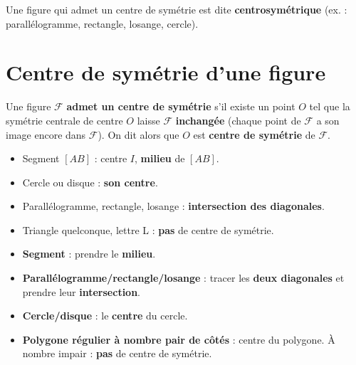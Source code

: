 \begin{remarkbox}
Une figure qui admet un centre de sym\'etrie est dite \textbf{centrosym\'etrique} (ex. : parall\'elogramme, rectangle, losange, cercle).
\end{remarkbox}

\section{Centre de symétrie d'une figure}

\begin{definitionbox}
Une figure $\mathcal F$ \textbf{admet un centre de symétrie} s'il existe un point $O$ tel que la symétrie centrale de centre $O$ laisse $\mathcal F$ \textbf{inchangée} (chaque point de $\mathcal F$ a son image encore dans $\mathcal F$). On dit alors que $O$ est \textbf{centre de symétrie} de $\mathcal F$.
\end{definitionbox}

\begin{examplebox}
\begin{itemize}
  \item Segment $[AB]$ : centre $I$, \textbf{milieu} de $[AB]$.
  \item Cercle ou disque : \textbf{son centre}.
  \item Parallélogramme, rectangle, losange : \textbf{intersection des diagonales}.
  \item Triangle quelconque, lettre \og L\fg{} : \textbf{pas} de centre de symétrie.
\end{itemize}

\begin{center}
\end{center}
\end{examplebox}

\begin{methodebox}
\begin{itemize}
  \item \textbf{Segment} : prendre le \textbf{milieu}.
  \item \textbf{Parallélogramme/rectangle/losange} : tracer les \textbf{deux diagonales} et prendre leur \textbf{intersection}.
  \item \textbf{Cercle/disque} : le \textbf{centre} du cercle.
  \item \textbf{Polygone régulier à nombre pair de côtés} : centre du polygone. À nombre impair : \textbf{pas} de centre de symétrie.
\end{itemize}
\end{methodebox}

